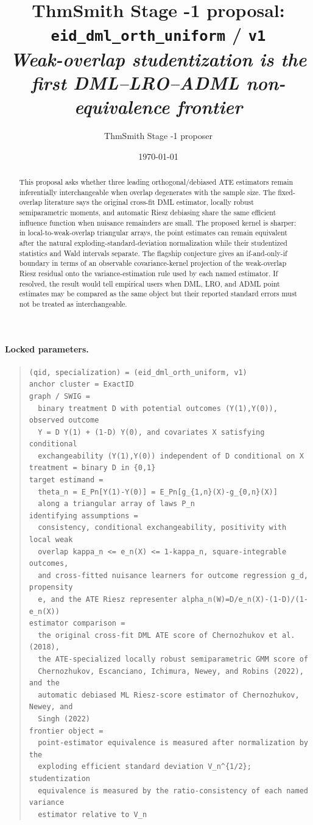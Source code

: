 \documentclass[11pt]{article}
\title{ThmSmith Stage -1 proposal: \texttt{eid\_dml\_orth\_uniform} / \texttt{v1}%
  \\ \large\textit{Weak-overlap studentization is the first DML--LRO--ADML non-equivalence frontier}}
\author{ThmSmith Stage -1 proposer}
\date{\today}
\theoremstyle{definition}
\theoremstyle{plain}
\theoremstyle{remark}
\begin{document}
\maketitle


\paragraph{Locked parameters.}
\begin{quote}\small
\begin{verbatim}
(qid, specialization) = (eid_dml_orth_uniform, v1)
anchor cluster = ExactID
graph / SWIG =
  binary treatment D with potential outcomes (Y(1),Y(0)), observed outcome
  Y = D Y(1) + (1-D) Y(0), and covariates X satisfying conditional
  exchangeability (Y(1),Y(0)) independent of D conditional on X
treatment = binary D in {0,1}
target estimand =
  theta_n = E_Pn[Y(1)-Y(0)] = E_Pn[g_{1,n}(X)-g_{0,n}(X)]
  along a triangular array of laws P_n
identifying assumptions =
  consistency, conditional exchangeability, positivity with local weak
  overlap kappa_n <= e_n(X) <= 1-kappa_n, square-integrable outcomes,
  and cross-fitted nuisance learners for outcome regression g_d, propensity
  e, and the ATE Riesz representer alpha_n(W)=D/e_n(X)-(1-D)/(1-e_n(X))
estimator comparison =
  the original cross-fit DML ATE score of Chernozhukov et al. (2018),
  the ATE-specialized locally robust semiparametric GMM score of
  Chernozhukov, Escanciano, Ichimura, Newey, and Robins (2022), and the
  automatic debiased ML Riesz-score estimator of Chernozhukov, Newey, and
  Singh (2022)
frontier object =
  point-estimator equivalence is measured after normalization by the
  exploding efficient standard deviation V_n^{1/2}; studentization
  equivalence is measured by the ratio-consistency of each named variance
  estimator relative to V_n
\end{verbatim}
\end{quote}

\begin{abstract}
This proposal asks whether three leading orthogonal/debiased ATE estimators remain inferentially interchangeable when overlap degenerates with the sample size.  The fixed-overlap literature says the original cross-fit DML estimator, locally robust semiparametric moments, and automatic Riesz debiasing share the same efficient influence function when nuisance remainders are small.  The proposed kernel is sharper: in local-to-weak-overlap triangular arrays, the point estimates can remain equivalent after the natural exploding-standard-deviation normalization while their studentized statistics and Wald intervals separate.  The flagship conjecture gives an if-and-only-if boundary in terms of an observable covariance-kernel projection of the weak-overlap Riesz residual onto the variance-estimation rule used by each named estimator.  If resolved, the result would tell empirical users when DML, LRO, and ADML point estimates may be compared as the same object but their reported standard errors must not be treated as interchangeable.
\end{abstract}
\end{document}
